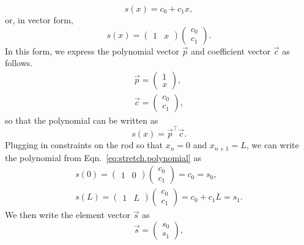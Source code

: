 \begin{equation}
s(x) = c_0 + c_1x,
\label{eq:stretch.polynomial}
\end{equation}
or, in vector form,
\begin{equation}
s(x) = 
\begin{pmatrix}
1 & x
\end{pmatrix}
\begin{pmatrix}
c_0 \\
c_1
\end{pmatrix}.
\end{equation}
In this form, we express the polynomial vector $\vec p$ and coefficient vector $\vec c$ as follows.
\begin{eqnarray}
\vec{p} =
\begin{pmatrix}
1 \\
x
\end{pmatrix}, \\
\vec{c} = 
\begin{pmatrix}
c_0 \\
c_1
\end{pmatrix},
\end{eqnarray}
so that the polynomial can be written as
\begin{equation}
s(x) = \vec{p}^\top\vec{c}.
\label{eq:stretch.polynomial.vector}
\end{equation}
Plugging in constraints on the rod so that $x_n=0$ and $x_{n+1}=L$, we can write the polynomial from Eqn.~\ref{eq:stretch.polynomial} as
\begin{eqnarray}
s(0) = 
\begin{pmatrix}
1 & 0
\end{pmatrix}
\begin{pmatrix}
c_0 \\
c_1
\end{pmatrix}
= c_0 = s_0,\\
s(L) = 
\begin{pmatrix}
1 & L
\end{pmatrix}
\begin{pmatrix}
c_0 \\
c_1
\end{pmatrix}
= c_0 + c_1L = s_1.
\end{eqnarray}
We then write the element vector $\vec s$ as
\begin{equation}
\vec s = 
\begin{pmatrix}
s_0 \\
s_1
\end{pmatrix},
\end{equation}
